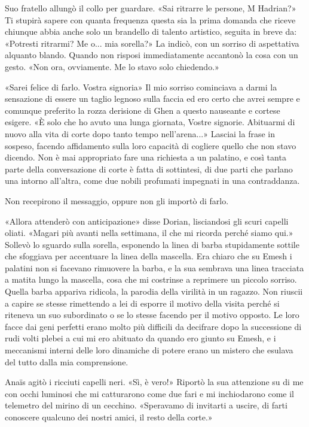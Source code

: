 Suo fratello allungò il collo per guardare. «Sai ritrarre le persone, M
Hadrian?» Ti stupirà sapere con quanta frequenza questa sia la prima
domanda che riceve chiunque abbia anche solo un brandello di talento
artistico, seguita in breve da: «Potresti ritrarmi? Me o... mia
sorella?» La indicò, con un sorriso di aspettativa alquanto blando.
Quando non risposi immediatamente accantonò la cosa con un gesto. «Non
ora, ovviamente. Me lo stavo solo chiedendo.»

«Sarei felice di farlo. Vostra signoria» Il mio sorriso cominciava a
darmi la sensazione di essere un taglio legnoso sulla faccia ed ero
certo che avrei sempre e comunque preferito la rozza derisione di Ghen a
questo nauseante e cortese esigere. «È solo che ho avuto una lunga
giornata, Vostre signorie. Abituarmi di nuovo alla vita di corte dopo
tanto tempo nell'arena...» Lasciai la frase in sospeso, facendo
affidamento sulla loro capacità di cogliere quello che non stavo
dicendo. Non è mai appropriato fare una richiesta a un palatino, e così
tanta parte della conversazione di corte è fatta di {sottintesi}, di due
parti che parlano una intorno all'altra, come due nobili profumati
impegnati in una contraddanza.

Non recepirono il messaggio, oppure non gli importò di farlo.

«Allora attenderò con anticipazione» disse Dorian, lisciandosi gli scuri
capelli oliati. «Magari più avanti nella settimana, il che mi ricorda
perché siamo qui.» Sollevò lo sguardo sulla sorella, esponendo la linea
di barba stupidamente sottile che sfoggiava per accentuare la linea
della mascella. Era chiaro che su Emesh i palatini non si facevano
rimuovere la barba, e la sua sembrava una linea tracciata a matita lungo
la mascella, cosa che mi costrinse a reprimere un piccolo sorriso.
Quella barba appariva ridicola, la parodia della virilità in un ragazzo.
Non riuscii a capire se stesse rimettendo a lei di esporre il motivo
della visita perché si riteneva un suo subordinato o se lo stesse
facendo per il motivo opposto. Le loro facce dai geni perfetti erano
molto più difficili da decifrare dopo la successione di rudi volti
plebei a cui mi ero abituato da quando ero giunto su Emesh, e i
meccanismi interni delle loro dinamiche di potere erano un mistero che
esulava del tutto dalla mia comprensione.

Anaïs agitò i ricciuti capelli neri. «Sì, è vero!» Riportò la sua
attenzione su di me con occhi luminosi che mi catturarono come due fari
e mi inchiodarono come il telemetro del mirino di un cecchino.
«Speravamo di invitarti a uscire, di farti conoscere qualcuno dei nostri
amici, il resto della corte.»


